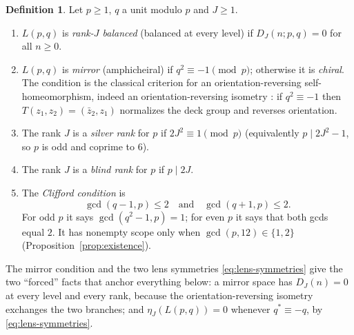 \documentclass[11pt]{article}
\theoremstyle{definition}
\newtheorem{definition}[theorem]{Definition}
\begin{document}
\begin{definition}
\label{def:terms}
Let $p\geq1$, $q$ a unit modulo $p$ and $J\geq1$.
\begin{enumerate}[label=(\alph*)]
\item $L(p,q)$ is \emph{rank-$J$ balanced} (balanced at every level)
if $D_J(n;p,q)=0$ for all $n\geq0$.
\item $L(p,q)$ is \emph{mirror} (amphicheiral) if $q^2\equiv-1\pmod p$;
otherwise it is \emph{chiral}.  The condition is the classical criterion
for an orientation-reversing self-homeomorphism, indeed an
orientation-reversing isometry
\cite{PrzytyckiYasuhara2003,Boldt2017}: if $q^2\equiv-1$ then
$T(z_1,z_2)=(\bar z_2,z_1)$ normalizes the deck group and reverses
orientation.
\item The rank $J$ is a \emph{silver rank} for $p$ if $2J^2\equiv1\pmod p$
(equivalently $p\mid2J^2-1$, so $p$ is odd and coprime to $6$).
\item The rank $J$ is a \emph{blind rank} for $p$ if $p\mid2J$.
\item The \emph{Clifford condition} is
\begin{equation}
 \gcd(q-1,p)\leq2\quad\text{and}\quad\gcd(q+1,p)\leq2.
 \tag{C}
 \label{eq:clifford}
\end{equation}
For odd $p$ it says $\gcd(q^2-1,p)=1$; for even $p$ it says that both
gcds equal $2$.  It has nonempty scope only when $\gcd(p,12)\in\{1,2\}$
(Proposition~\ref{prop:existence}).
\end{enumerate}
\end{definition}

The mirror condition and the two lens symmetries
\eqref{eq:lens-symmetries} give the two ``forced'' facts that anchor
everything below: a mirror space has $D_J(n)=0$ at every level and every
rank, because the orientation-reversing isometry exchanges the two
branches; and $\eta_J(L(p,q))=0$ whenever $q^*\equiv-q$, by
\eqref{eq:lens-symmetries}.
\end{document}
